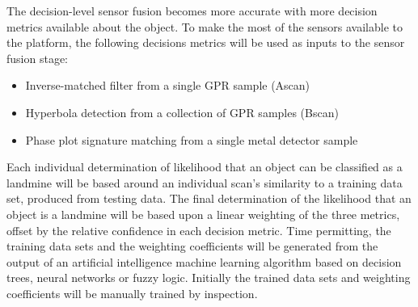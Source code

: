 \documentclass[main.tex]{subfiles}
\begin{document}
The decision-level sensor fusion becomes more accurate with more decision metrics available about the object. To make the most of the sensors available to the platform, the following decisions metrics will be used as inputs to the sensor fusion stage:
\begin{itemize}
\item Inverse-matched filter from a single GPR sample (Ascan)
\item Hyperbola detection from a collection of GPR samples (Bscan)
\item Phase plot signature matching from a single metal detector sample
\end{itemize}
Each individual determination of likelihood that an object can be classified as a landmine will be based around an individual scan's similarity to a training data set, produced from testing data. The final determination of the likelihood that an object is a landmine will be based upon a linear weighting of the three metrics, offset by the relative confidence in each decision metric. Time permitting, the training data sets and the weighting coefficients will be generated from the output of an artificial intelligence machine learning algorithm based on decision trees, neural networks or fuzzy logic. Initially the trained data sets and weighting coefficients will be manually trained by inspection.
\end{document}
